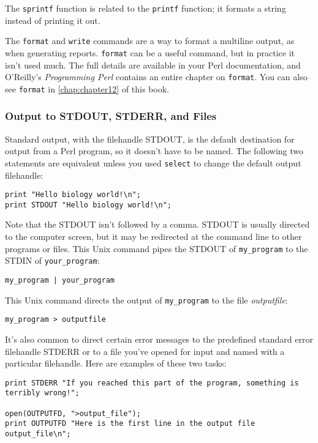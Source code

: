 The \verb|sprintf| function is related to the \verb|printf| function; it formats a string instead of printing it out.

The \verb|format| and \verb|write| commands are a way to format a multiline output, as when generating reports. \verb|format| can be a useful command, but in practice it isn't used much. The full details are available in your Perl documentation, and O'Reilly's \textit{Programming Perl} contains an entire chapter on \verb|format|. You can also see \verb|format| in \autoref{chap:chapter12} of this book. 

\subsubsection{Output to STDOUT, STDERR, and Files}
Standard output, with the filehandle STDOUT, is the default destination for output from a Perl program, so it doesn't have to be named. The following two statements are equivalent unless you used \verb|select| to change the default output filehandle:

\begin{lstlisting}
print "Hello biology world!\n";
print STDOUT "Hello biology world!\n";
\end{lstlisting}

Note that the STDOUT isn't followed by a comma. STDOUT is usually directed to the computer screen, but it may be redirected at the command line to other programs or files. This Unix command pipes the STDOUT of \verb|my_program| to the STDIN of \verb|your_program|:

\begin{lstlisting}
my_program | your_program 
\end{lstlisting} 

This Unix command directs the output of \verb|my_program| to the file \textit{outputfile}:

\begin{lstlisting}
my_program > outputfile
\end{lstlisting}

It's also common to direct certain error messages to the predefined standard error filehandle STDERR or to a file you've opened for input and named with a particular filehandle. Here are examples of these two tasks:

\begin{lstlisting}
print STDERR "If you reached this part of the program, something is terribly wrong!";

open(OUTPUTFD, ">output_file");
print OUTPUTFD "Here is the first line in the output file output_file\n";
\end{lstlisting}

